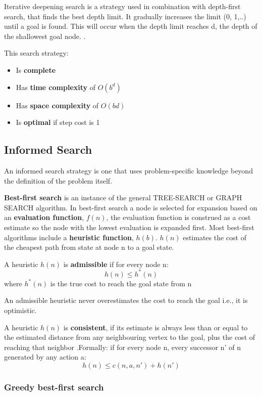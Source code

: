 \documentclass{article}
\begin{document}
Iterative deepening search is a strategy used in combination with depth-first search, that finds the best depth limit. It gradually increases the limit (0, 1,..) until a goal is found. This will occur when the depth limit reaches d, the depth of the shallowest goal node. . 

This search strategy:
\begin{itemize}
    \item Is \textbf{complete} 
    \item Has \textbf{time complexity} of $O(b^d)$ 
    \item Has \textbf{space complexity} of $O(bd)$
    \item Is \textbf{optimal} if step cost is 1
\end{itemize}

\subsection{Informed Search}

An informed search strategy is one that uses problem-specific knowledge beyond the definition of the problem itself.

\textbf{Best-first search} is an instance of the general TREE-SEARCH or GRAPH SEARCH algorithm. In best-first search a node is selected for expansion based on an \textbf{evaluation function}, $f(n)$, the evaluation function is construed as a cost estimate so the node with the lowest evaluation is expanded first. 
Most best-first algorithms include a \textbf{heuristic function}, $h(b)$. $h(n)$ estimates the cost of the cheapest path from state at node n to a goal state.  

A heuristic $h(n)$ is \textbf{admissible} if for every node n: $$h(n) \leq h^*(n)$$ where $h^*(n)$ is the true cost to reach the goal state from n 

An admissible heuristic never overestimates the cost to reach the goal i.e., it is optimistic. 

A heuristic $h(n)$ is \textbf{consistent}, if its estimate is always less than or equal to the estimated distance from any neighbouring vertex to the goal, plus the cost of reaching that neighbor .Formally: if for every node n, every successor n' of n generated by any action a: $$h(n) \leq c(n, a, n') + h(n')$$ 


\subsubsection{Greedy best-first search}
\end{document}

